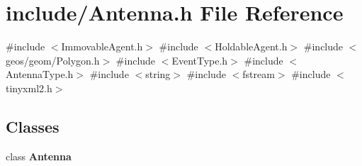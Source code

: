 \section{include/\+Antenna.h File Reference}
\label{_antenna_8h}
{\ttfamily \#include $<$Immovable\+Agent.\+h$>$}\newline
{\ttfamily \#include $<$Holdable\+Agent.\+h$>$}\newline
{\ttfamily \#include $<$geos/geom/\+Polygon.\+h$>$}\newline
{\ttfamily \#include $<$Event\+Type.\+h$>$}\newline
{\ttfamily \#include $<$Antenna\+Type.\+h$>$}\newline
{\ttfamily \#include $<$string$>$}\newline
{\ttfamily \#include $<$fstream$>$}\newline
{\ttfamily \#include $<$tinyxml2.\+h$>$}\newline
\subsection*{Classes}
\begin{DoxyCompactItemize}
\item 
class \textbf{ Antenna}
\end{DoxyCompactItemize}

